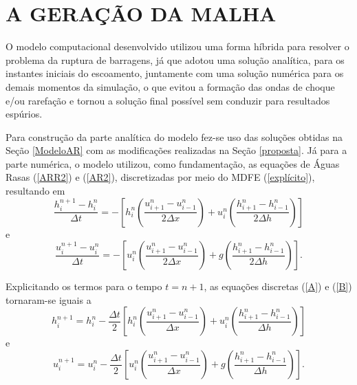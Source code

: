    
\section{A GERAÇÃO DA MALHA} \label{malha}

O modelo computacional desenvolvido utilizou uma forma híbrida para resolver o problema da ruptura de barragens, já que adotou uma solução analítica, para os instantes iniciais do escoamento, juntamente com uma solução numérica para os demais momentos da simulação, o que evitou a formação das ondas de choque e/ou rarefação e tornou a solução final possível sem conduzir para resultados espúrios.

Para construção da parte analítica do modelo fez-se uso das soluções obtidas na Seção \ref{ModeloAR} com as modificações realizadas na Seção \ref{proposta}. Já para a parte numérica, o modelo utilizou, como fundamentação, as equações de Águas Rasas (\ref{ARR2}) e (\ref{AR2}), discretizadas por meio do MDFE (\ref{explícito}), resultando em
\begin{equation} \label{A}
\frac{h^{n+1}_{i}-h^{n}_{i}}{\Delta t}= - \left[h^{n}_{i} \left( \frac{u^{n}_{i+1}-u^{n}_{i-1}}{2 \Delta x} \right) + u^{n}_{i} \left( \frac{h^{n}_{i+1}-h^{n}_{i-1}}{2 \Delta h} \right) \right]
\end{equation}   
e
\begin{equation} \label{B}
\frac{u^{n+1}_{i}-u^{n}_{i}}{\Delta t}= - \left[u^{n}_{i} \left( \frac{u^{n}_{i+1}-u^{n}_{i-1}}{2 \Delta x} \right) + g \left( \frac{h^{n}_{i+1}-h^{n}_{i-1}}{2 \Delta h} \right) \right].
\end{equation}

Explicitando os termos para o tempo $t=n+1$, as equações discretas (\ref{A}) e (\ref{B}) tornaram-se iguais a
\begin{equation} \label{C}
h^{n+1}_{i} =  h^{n}_{i} - \frac{\Delta t}{2} \left[h^{n}_{i} \left( \frac{u^{n}_{i+1}-u^{n}_{i-1}}{ \Delta x} \right) + u^{n}_{i} \left( \frac{h^{n}_{i+1}-h^{n}_{i-1}}{ \Delta h} \right) \right]
\end{equation}
e
\begin{equation} \label{D}
u^{n+1}_{i} = u^{n}_{i} - \frac{\Delta t}{2} \left[u^{n}_{i} \left( \frac{u^{n}_{i+1}-u^{n}_{i-1}}{ \Delta x} \right) + g \left( \frac{h^{n}_{i+1}-h^{n}_{i-1}}{ \Delta h} \right) \right].
\end{equation}

